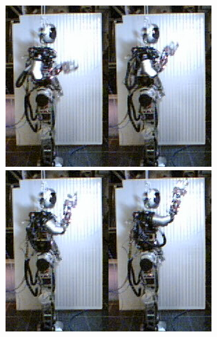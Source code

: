 \begin{figure}[ht]
  \centering

\includegraphics[width=0.25\columnwidth]{./pix/slowMotion/1.png}\includegraphics[width=0.25\columnwidth]{./pix/slowMotion/3.png}\includegraphics[width=0.25\columnwidth]{./pix/slowMotion/5.png}\includegraphics[width=0.25\columnwidth]{./pix/slowMotion/7.png}

\end{figure}

